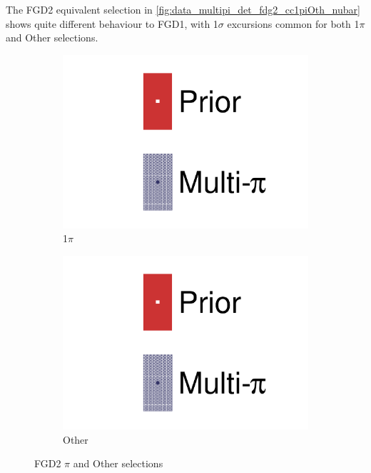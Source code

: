 The FGD2 equivalent selection in \autoref{fig:data_multipi_det_fdg2_cc1piOth_nubar} shows quite different behaviour to FGD1, with 1$\sigma$ excursions common for both 1$\pi$ and Other selections.
\begin{figure}[h]
	\centering
	\begin{subfigure}[t]{0.32\textwidth}
		\includegraphics[width=\textwidth,page=50, trim={0mm 0mm 0mm 0mm}, clip]{figures/mach3/2018/data/2018a_FixedCov_RedCov_Mpi_Data_merge_drawPar_withDet}
		\caption{1$\pi$}
	\end{subfigure}
	\begin{subfigure}[t]{0.32\textwidth}
		\includegraphics[width=\textwidth,page=51, trim={0mm 0mm 0mm 0mm}, clip]{figures/mach3/2018/data/2018a_FixedCov_RedCov_Mpi_Data_merge_drawPar_withDet}
		\caption{Other}
	\end{subfigure}
	\caption{FGD2 $\pi$ and Other selections}
	\label{fig:data_multipi_det_fdg2_cc1piOth_nubar}
\end{figure}

